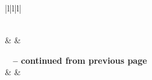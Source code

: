 \begin{longtable}{|l|l|l|}
	\caption{This table can be used if more than one page table content is required. However it is limited to maximum of two pages only.} \label{tab:long} \\
	
	\hline {} &  &  \\ \hline 
	\endfirsthead
	
	{{\bfseries \tablename\ \thetable{} -- continued from previous page}} \\
	\hline {} &  &  \\ \hline 
	\endhead
	
	\hline {} \\ \hline
	\endfoot
	
	\hline \hline
	\endlastfoot
	

\end{longtable}
